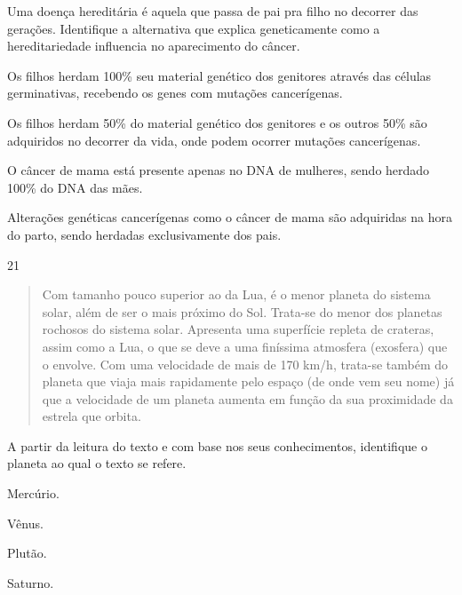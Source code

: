\pagebreak
Uma doença hereditária é aquela que passa de pai pra filho no decorrer
das gerações. Identifique a alternativa que explica geneticamente como a
hereditariedade influencia no aparecimento do câncer.

\begin{escolha}
\item
  Os filhos herdam 100\% seu material genético dos genitores através das
  células germinativas, recebendo os genes com mutações cancerígenas.
\item
  Os filhos herdam 50\% do material genético dos genitores e os outros
  50\% são adquiridos no decorrer da vida, onde podem ocorrer mutações
  cancerígenas.
\item
  O câncer de mama está presente apenas no DNA de mulheres, sendo herdado
  100\% do DNA das mães.
\item
  Alterações genéticas cancerígenas como o câncer de mama são adquiridas
  na hora do parto, sendo herdadas exclusivamente dos pais.
\end{escolha}


\num{21}
\begin{quote}
  Com tamanho pouco superior ao da Lua, é o menor planeta do sistema solar, além de ser o mais próximo do Sol. Trata-se do menor
  dos planetas rochosos do sistema solar. Apresenta uma superfície repleta de crateras, assim como a Lua, o que se deve a uma
  finíssima atmosfera (exosfera) que o envolve. Com uma
  velocidade de mais de 170 km/h, trata-se também do
  planeta que viaja mais rapidamente pelo espaço (de onde vem seu nome)
  já que a velocidade de um planeta aumenta em função da sua proximidade
  da estrela que orbita.

\end{quote}

A partir da leitura do texto e com base nos seus conhecimentos,
identifique o planeta ao qual o texto se refere.

\begin{escolha}
\item
  Mercúrio.
\item
  Vênus.
\item
  Plutão.
\item
  Saturno.
\end{escolha}
